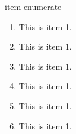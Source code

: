 \documentclass[aspectratio=169,xcolor=dvipsnames]{beamer}
\begin{document}
\begin{frame}{item-enumerate}
\begin{enumerate}
	\item This is item 1.
	\vspace*{1em}
	\item This is item 1.
	\vspace*{1em}
	\item This is item 1.
	\vspace*{1em}
	\item This is item 1.
	\vspace*{1em}
	\item This is item 1.
	\vspace*{1em}
	\item This is item 1.
\end{enumerate}
\end{frame}
\end{document}

